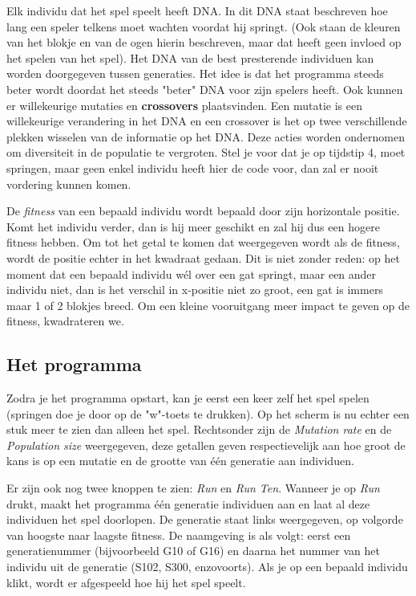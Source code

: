 Elk individu dat het spel speelt heeft DNA. In dit DNA staat beschreven hoe lang een speler telkens moet wachten voordat hij springt. (Ook staan de kleuren van het blokje en van de ogen hierin beschreven, maar dat heeft geen invloed op het spelen van het spel). Het DNA van de best presterende individuen kan worden doorgegeven tussen generaties. Het idee is dat het programma steeds beter wordt doordat het steeds "beter" DNA voor zijn spelers heeft.
Ook kunnen er willekeurige mutaties en \textbf{crossovers} plaatsvinden. Een mutatie is een willekeurige verandering in het DNA en een crossover is het op twee verschillende plekken wisselen van de informatie op het DNA. Deze acties worden ondernomen om diversiteit in de populatie te vergroten. Stel je voor dat je op tijdstip 4, moet springen, maar geen enkel individu heeft hier de code voor, dan zal er nooit vordering kunnen komen.

De \textit{fitness} van een bepaald individu wordt bepaald door zijn horizontale positie. Komt het individu verder, dan is hij meer geschikt en zal hij dus een hogere fitness hebben. Om tot het getal te komen dat weergegeven wordt als de fitness, wordt de positie echter in het kwadraat gedaan. Dit is niet zonder reden: op het moment dat een bepaald individu w\'el over een gat springt, maar een ander individu niet, dan is het verschil in x-positie niet zo groot, een gat is immers maar 1 of 2 blokjes breed. Om een kleine vooruitgang meer impact te geven op de fitness, kwadrateren we.

\subsection{Het programma}
Zodra je het programma opstart, kan je eerst een keer zelf het spel spelen (springen doe je door op de "w"-toets te drukken). Op het scherm is nu echter een stuk meer te zien dan alleen het spel. Rechtsonder zijn de \textit{Mutation rate} en de \textit{Population size} weergegeven, deze getallen geven respectievelijk aan hoe groot de kans is op een mutatie en de grootte van één generatie aan individuen.

Er zijn ook nog twee knoppen te zien: \textit{Run} en \textit{Run Ten}. Wanneer je op \textit{Run} drukt, maakt het programma \'e\'en generatie individuen aan en laat al deze individuen het spel doorlopen. De generatie staat links weergegeven, op volgorde van hoogste naar laagste fitness. De naamgeving is als volgt: eerst een generatienummer (bijvoorbeeld G10 of G16) en daarna het nummer van het individu uit de generatie (S102, S300, enzovoorts). Als je op een bepaald individu klikt, wordt er afgespeeld hoe hij het spel speelt.


